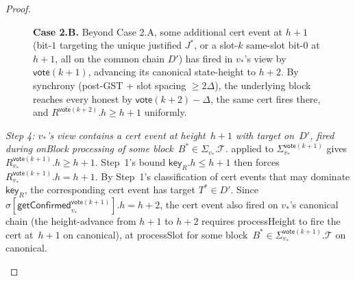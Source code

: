 \ifx\litemode\undefined\documentclass{article}\fi
\newcommand{\T}[0]{\ensuremath{\mathcal{T}}}
\newcommand{\key}{\mathsf{key}}
\newcommand{\vote}{\mathsf{vote}}
\newcommand{\getConfirmed}{\textsf{getConfirmed}\xspace}
\theoremstyle{plain}
\theoremstyle{definition}
\theoremstyle{remark}
\begin{document}
\begin{proof}
\begin{description}
\begin{description}
\begin{figure}[H]
\caption{\label{rev:fig:hfj-case2b}\textbf{Case 2.B.} Beyond Case 2.A, some additional cert event at $h+1$ (bit-$1$ targeting the unique justified $J^*$, or a slot-$k$ same-slot bit-$0$ at $h+1$, all on the common chain $D'$) has fired in $v_*$'s view by $\vote(k+1)$, advancing its canonical state-height to $h+2$. By synchrony (post-GST + slot spacing $\geq 2\Delta$), the underlying block reaches every honest by $\vote(k+2) - \Delta$, the same cert fires there, and $R^{\vote(k+2)}.h \geq h+1$ uniformly.}
\end{figure}

\emph{Step 4: $v_*$'s view contains a cert event at height~$h+1$ with target on~$D'$, fired during onBlock processing of some block~$B^* \in \Sigma_{v_*}.\T$.}
 applied to $\Sigma_{v_*}^{\vote(k+1)}$ gives $R_{v_*}^{\vote(k+1)}.h \geq h+1$. Step~1's bound $\key_R.h \leq h+1$ then forces $R_{v_*}^{\vote(k+1)}.h = h+1$. By Step~1's classification of cert events that may dominate $\key_R$, the corresponding cert event has target $T^* \in D'$. Since $\sigma[\getConfirmed_{v_*}^{\vote(k+1)}].h = h+2$, the cert event also fired on $v_*$'s canonical chain (the height-advance from $h+1$ to $h+2$ requires processHeight to fire the cert at~$h+1$ on canonical), at processSlot for some block~$B^* \in \Sigma_{v_*}^{\vote(k+1)}.\T$ on canonical.


\end{description}
\end{description}
\end{proof}
\end{document}
